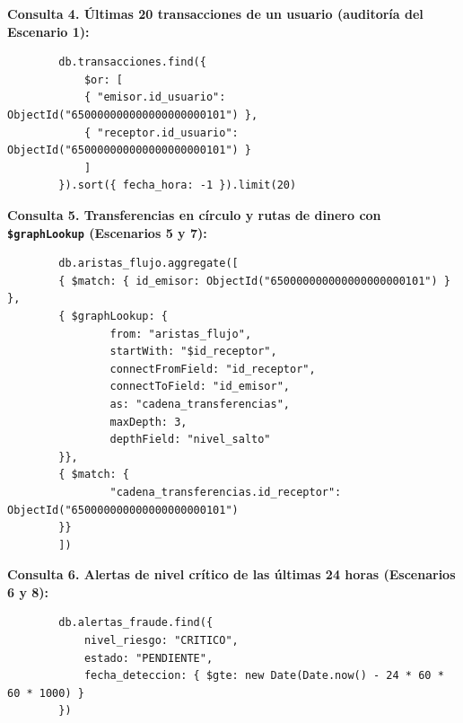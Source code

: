 \documentclass[11pt,a4paper]{article}
\begin{document}
	\textbf{Consulta 4. Últimas 20 transacciones de un usuario (auditoría del Escenario 1):}
	\begin{lstlisting}
		db.transacciones.find({
			$or: [
			{ "emisor.id_usuario": ObjectId("650000000000000000000101") },
			{ "receptor.id_usuario": ObjectId("650000000000000000000101") }
			]
		}).sort({ fecha_hora: -1 }).limit(20)
	\end{lstlisting}
	
	\textbf{Consulta 5. Transferencias en círculo y rutas de dinero con \texttt{\$graphLookup} (Escenarios 5 y 7):}
	\begin{lstlisting}
		db.aristas_flujo.aggregate([
		{ $match: { id_emisor: ObjectId("650000000000000000000101") } },
		{ $graphLookup: {
				from: "aristas_flujo",
				startWith: "$id_receptor",
				connectFromField: "id_receptor",
				connectToField: "id_emisor",
				as: "cadena_transferencias",
				maxDepth: 3,
				depthField: "nivel_salto"
		}},
		{ $match: {
				"cadena_transferencias.id_receptor": ObjectId("650000000000000000000101")
		}}
		])
	\end{lstlisting}
	
	\textbf{Consulta 6. Alertas de nivel crítico de las últimas 24 horas (Escenarios 6 y 8):}
	\begin{lstlisting}
		db.alertas_fraude.find({
			nivel_riesgo: "CRITICO",
			estado: "PENDIENTE",
			fecha_deteccion: { $gte: new Date(Date.now() - 24 * 60 * 60 * 1000) }
		})
	\end{lstlisting}
	
\end{document}
